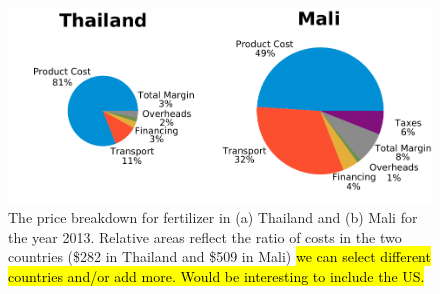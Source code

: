 \begin{figure}
    \centering
    \includegraphics[width=1\textwidth]{Figures/Cost_Breakdown.pdf}
    \caption{The price breakdown for fertilizer in (a) Thailand and (b) Mali for the year 2013. Relative areas reflect the ratio of costs in the two countries (\$282 in Thailand and  \$509 in Mali) \cite{Wanzala2013} \hl{we can select different countries and/or add more. Would be interesting to include the US.}}
    \label{fig:cost_pies}
\end{figure}





